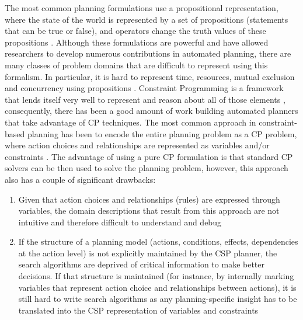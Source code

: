 {The most common planning formulations use a propositional
representation, where the state of the world is represented by a set
of propositions (statements that can be true or false), and operators
change the truth values of these propositions \cite{gen87}. Although
these formulations are powerful and have allowed researchers to
develop numerous contributions in automated planning, there are many
classes of problem domains that are difficult to represent using this
formalism. In particular, it is hard to represent time, resources,
mutual exclusion and concurrency using propositions \cite{ghallab04}.
Constraint Programming is a framework that lends itself very well to
represent and reason about all of those elements \cite{ghallab94},
consequently, there has been a good amount of work building automated
planners that take advantage of CP techniques.  The most common
approach in constraint-based planning has been to encode the entire
planning problem as a CP problem, where action choices and
relationships are represented as variables and/or constraints
\cite{do01,vanbeek99,vossen99,wolfman99}.  The advantage of using a
pure CP formulation is that standard CP solvers can be then used to
solve the planning problem, however, this approach also has a couple
of significant drawbacks:

\begin{enumerate} 

\item Given that action choices and relationships (rules) are expressed
  through variables, the domain descriptions that result from this
  approach are not intuitive and therefore difficult to understand and
  debug

\item If the structure of a planning model (actions, conditions,
  effects, dependencies at the action level) is not explicitly
  maintained by the CSP planner, the search algorithms are deprived of
  critical information to make better decisions. If that structure is
  maintained (for instance, by internally marking variables that
  represent action choice and relationships between actions), it is
  still hard to write search algorithms as any planning-specific
  insight has to be translated into the CSP representation of
  variables and constraints 


\end{enumerate}}
